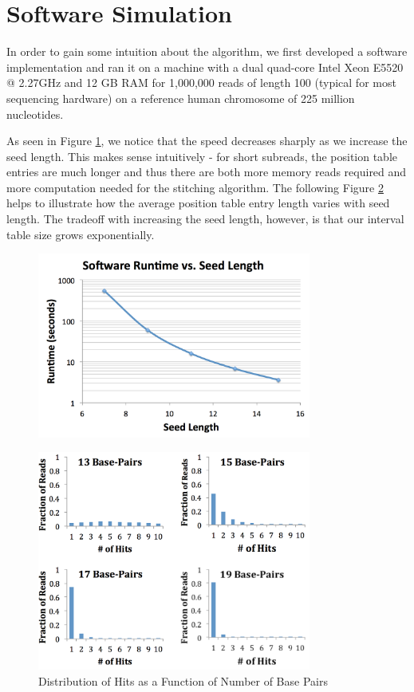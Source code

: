 \documentclass[11pt]{article}
\begin{document}
\section{Software Simulation}

In order to gain some intuition about the algorithm, we first developed a software implementation and ran it on a machine with a dual quad-core Intel Xeon E5520 @ 2.27GHz and 12 GB RAM for 1,000,000 reads of length 100 (typical for most sequencing hardware) on a reference human chromosome of 225 million nucleotides.


As seen in Figure \ref{speedvsseedlen}, we notice that the speed decreases sharply as we increase the seed length. This makes sense intuitively - for short subreads, the position table entries are much longer and thus there are both more memory reads required and more computation needed for the stitching algorithm. The following Figure \ref{histogram} helps to illustrate how the average position table entry length varies with seed length. The tradeoff with increasing the seed length, however, is that our interval table size grows exponentially.
\begin{figure}[ht!]
\centering
\includegraphics[width=90mm]{swruntime.png}
\caption{}
\label{speedvsseedlen}
\end{figure}

\begin{figure}[ht!]
\centering
\includegraphics[width=90mm]{readsvhits.png}
\caption{Distribution of Hits as a Function of Number of Base Pairs}
\label{histogram}
\end{figure}
\end{document}
